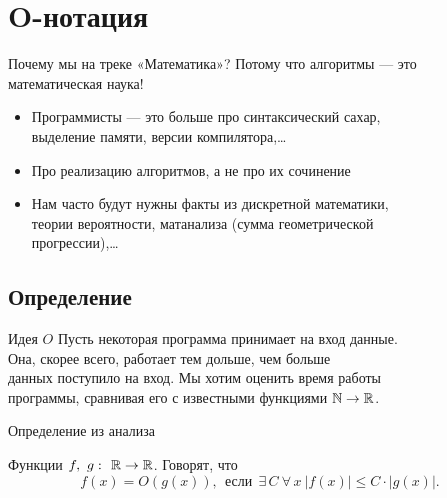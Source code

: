 \section{O-нотация}

\begin{frame}{Почему мы на треке «Математика»?}
Потому что алгоритмы — это математическая наука!

\begin{itemize}
  \item Программисты — это больше про синтаксический сахар,\\
  выделение памяти, версии компилятора,\ldots \medskip
  \item Про реализацию алгоритмов, а не про их сочинение \medskip
  \item Нам часто будут нужны факты из дискретной математики,\\
  теории вероятности, матанализа (сумма геометрической\\
  прогрессии),\ldots
\end{itemize}
\end{frame}

\subsection{Определение}

\begin{frame}{Идея \(O\)}
	Пусть некоторая программа принимает на вход данные. \\
	Она, скорее всего, работает тем дольше, чем больше \\
	данных поступило на вход. Мы хотим оценить время работы \\
	программы, сравнивая его с известными функциями \(\mathbb{N} \to \mathbb{R}\).
\end{frame}


\begin{frame}{Определение из анализа}
\begin{defn}
	Функции \(f,\ g\,\colon\ \mathbb{R} \to \mathbb{R}\). Говорят, что
		\[f(x) = O(g(x)),\ \ \text{если}\ \ \exists\,C\ \forall\,x\ 
			|f(x)| \le C \cdot |g(x)|. \]
\end{defn}
\end{frame}


